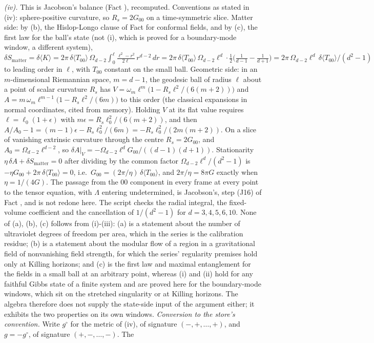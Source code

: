 \emph{(iv).} This is Jacobson's balance (Fact ), recomputed. Conventions as stated in (iv): sphere-positive curvature, so $R_{s} = 2G_{00}$ on a time-symmetric slice. Matter side: by (b), the Hislop-Longo clause of Fact  for conformal fields, and by (c), the first law for the ball's state (not (i), which is proved for a boundary-mode window, a different system), $\delta S_{\mathrm{matter}} = \delta\langle K\rangle = 2\pi\,\delta\langle T_{00}\rangle\,\Omega_{d-2}\int_{0}^{\ell}\tfrac{\ell^{2} - r^{2}}{2\ell}\,r^{d-2}\,dr = 2\pi\,\delta\langle T_{00}\rangle\,\Omega_{d-2}\ell^{d}\cdot\tfrac12\bigl(\tfrac{1}{d-1} - \tfrac{1}{d+1}\bigr) = 2\pi\,\Omega_{d-2}\ell^{d}\,\delta\langle T_{00}\rangle/(d^{2} - 1)$ to leading order in $\ell$, with $T_{00}$ constant on the small ball. Geometric side: in an $m$-dimensional Riemannian space, $m = d - 1$, the geodesic ball of radius $\ell$ about a point of scalar curvature $R_{s}$ has $V = \omega_{m}\ell^{m}\bigl(1 - R_{s}\ell^{2}/(6(m+2))\bigr)$ and $A = m\,\omega_{m}\ell^{m-1}\bigl(1 - R_{s}\ell^{2}/(6m)\bigr)$ to this order (the classical expansions in normal coordinates, cited from memory). Holding $V$ at its flat value requires $\ell = \ell_{0}(1 + \epsilon)$ with $m\epsilon = R_{s}\ell_{0}^{2}/(6(m+2))$, and then $A/A_{0} - 1 = (m - 1)\epsilon - R_{s}\ell_{0}^{2}/(6m) = -R_{s}\ell_{0}^{2}/(2m(m+2))$. On a slice of vanishing extrinsic curvature through the centre $R_{s} = 2G_{00}$, and $A_{0} = \Omega_{d-2}\ell^{d-2}$, so $\delta A|_{V} = -\Omega_{d-2}\ell^{d}G_{00}/((d-1)(d+1))$. Stationarity $\eta\,\delta A + \delta S_{\mathrm{matter}} = 0$ after dividing by the common factor $\Omega_{d-2}\ell^{d}/(d^{2} - 1)$ is $-\eta G_{00} + 2\pi\,\delta\langle T_{00}\rangle = 0$, i.e.\ $G_{00} = (2\pi/\eta)\,\delta\langle T_{00}\rangle$, and $2\pi/\eta = 8\pi G$ exactly when $\eta = 1/(4G)$. The passage from the $00$ component in every frame at every point to the tensor equation, with $\Lambda$ entering undetermined, is Jacobson's, step (J16) of Fact , and is not redone here. The script checks the radial integral, the fixed-volume coefficient and the cancellation of $1/(d^{2} - 1)$ for $d = 3, 4, 5, 6, 10$. None of (a), (b), (c) follows from (i)-(iii): (a) is a statement about the number of ultraviolet degrees of freedom per area, which in the series is the calibration residue; (b) is a statement about the modular flow of a region in a gravitational field of nonvanishing field strength, for which the series' regularity premises hold only at Killing horizons; and (c) is the first law and maximal entanglement for the fields in a small ball at an arbitrary point, whereas (i) and (ii) hold for any faithful Gibbs state of a finite system and are proved here for the boundary-mode windows, which sit on the stretched singularity or at Killing horizons. The algebra therefore does not supply the state-side input of the argument either; it exhibits the two properties on its own windows. \emph{Conversion to the store's convention.} Write $g^{\circ}$ for the metric of (iv), of signature $(-,+,\ldots,+)$, and $g = -g^{\circ}$, of signature $(+,-,\ldots,-)$. The 